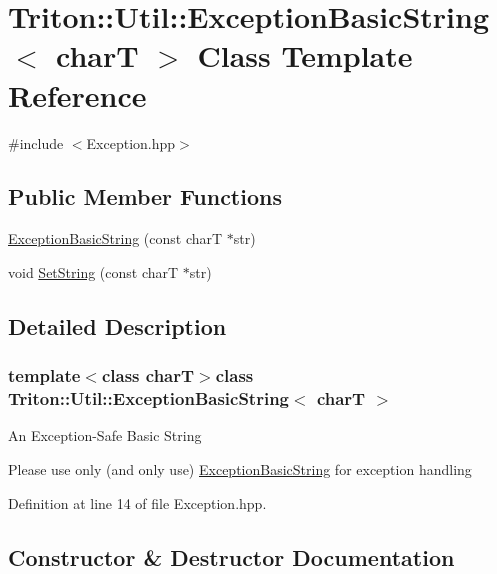 \hypertarget{class_triton_1_1_util_1_1_exception_basic_string}{}\section{Triton\+:\+:Util\+:\+:Exception\+Basic\+String$<$ char\+T $>$ Class Template Reference}
\label{class_triton_1_1_util_1_1_exception_basic_string}


{\ttfamily \#include $<$Exception.\+hpp$>$}

\subsection*{Public Member Functions}
\begin{DoxyCompactItemize}
\item 
\hyperlink{class_triton_1_1_util_1_1_exception_basic_string_aa2af15f1d1911f2269c479f14eb7c3c9}{Exception\+Basic\+String} (const char\+T $\ast$str)
\item 
void \hyperlink{class_triton_1_1_util_1_1_exception_basic_string_a0e7d5a5cdc80660e6f3e6de9b5c9828e}{Set\+String} (const char\+T $\ast$str)
\end{DoxyCompactItemize}


\subsection{Detailed Description}
\subsubsection*{template$<$class char\+T$>$class Triton\+::\+Util\+::\+Exception\+Basic\+String$<$ char\+T $>$}

An Exception-\/\+Safe Basic String

Please use only (and only use) \hyperlink{class_triton_1_1_util_1_1_exception_basic_string}{Exception\+Basic\+String} for exception handling 

Definition at line 14 of file Exception.\+hpp.



\subsection{Constructor \& Destructor Documentation}
\hypertarget{class_triton_1_1_util_1_1_exception_basic_string_aa2af15f1d1911f2269c479f14eb7c3c9}{}
